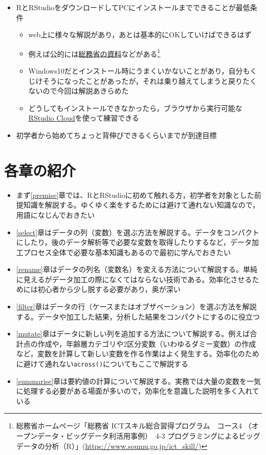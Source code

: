 \documentclass[
  xelatex,ja=standard, b5paper]{bxjsbook}
\providecommand{\tightlist}{%
  \setlength{\itemsep}{0pt}\setlength{\parskip}{0pt}}
\begin{document}
\begin{itemize}
\tightlist
\item
  RとRStudioをダウンロードしてPCにインストールまでできることが最低条件

  \begin{itemize}
  \tightlist
  \item
    web上に様々な解説があり，あとは基本的にOKしていけばできるはず
  \item
    例えば公的には\href{https://www.soumu.go.jp/ict_skill/}{総務省の資料}などがある\footnote{総務省ホームページ「総務省 ICTスキル総合習得プログラム　コース4
      （オープンデータ・ビッグデータ利活用事例）　4-3 プログラミングによるビッグデータの分析（R）」(\url{https://www.soumu.go.jp/ict_skill/})}
  \item
    Windows10だとインストール時にうまくいかないことがあり，自分もくじけそうになったことがあったが，それは乗り越えてしまうと戻りたくないので今回は解説あきらめた
  \item
    どうしてもインストールできなかったら，ブラウザから実行可能な\href{https://rstudio.cloud/}{RStudio Cloud}を使って練習できる
  \end{itemize}
\item
  初学者から始めてちょっと背伸びできるくらいまでが到達目標
\end{itemize}

\hypertarget{ux5404ux7ae0ux306eux7d39ux4ecb}{%
\section*{各章の紹介}\label{ux5404ux7ae0ux306eux7d39ux4ecb}}

\begin{itemize}
\item
  まず\ref{premise}章では、RとRStudioに初めて触れる方，初学者を対象とした前提知識を解説する。ゆくゆく楽をするためには避けて通れない知識なので，用語になじんでおきたい
\item
  \ref{select}章はデータの列（変数）を選ぶ方法を解説する。データをコンパクトにしたり，後のデータ解析等で必要な変数を取得したりするなど，データ加工プロセス全体で必要な基本知識もあるので最初に学んでおきたい
\item
  \ref{rename}章はデータの列名（変数名）を変える方法について解説する。単純に見えるがデータ加工の際になくてはならない技術である。効率化させるためには初心者から少し脱する必要があり，奥が深い
\item
  \ref{filter}章はデータの行（ケースまたはオブザベーション）を選ぶ方法を解説する。データや加工した結果，分析した結果をコンパクトにするのに役立つ
\item
  \ref{mutate}章はデータに新しい列を追加する方法について解説する。例えば合計点の作成や，年齢層カテゴリや2区分変数（いわゆるダミー変数）の作成など，変数を計算して新しい変数を作る作業はよく発生する。効率化のために避けて通れない\texttt{across()}についてもここで解説する
\item
  \ref{summarise}章は要約値の計算について解説する。実務では大量の変数を一気に処理する必要がある場面が多いので，効率化を意識した説明を多く入れている
\end{itemize}
\end{document}
